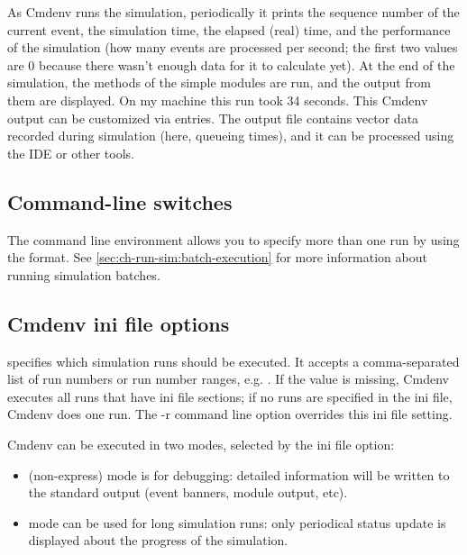 As Cmdenv runs the simulation, periodically it prints the sequence number
of the current event, the simulation time, the elapsed (real) time,
and the performance of the simulation (how many events are processed per
second; the first two values are 0 because there wasn't enough data
for it to calculate yet). At the end of the simulation, the 
methods of the simple modules are run, and the output from them are displayed.
On my machine this run took 34 seconds. This Cmdenv output can be
customized via  entries. The output file 
contains vector data recorded during simulation (here, queueing times),
and it can be processed using the IDE or other tools.

\subsection{Command-line switches}

The command line environment allows you to specify more than one run by
using the  format. See \ref{sec:ch-run-sim:batch-execution}
for more information about running simulation batches.

\subsection{Cmdenv ini file options}
\label{sec:ch-run-sim:cmdenv-section}

 specifies which simulation runs should be executed.
It accepts a comma-separated list of run numbers or run number ranges, e.g.
. If the value is missing, Cmdenv executes all runs that have
ini file sections; if no runs are specified in the ini file, Cmdenv does one run.
The -r command line option overrides this ini file setting.


Cmdenv can be executed in two modes, selected by the 
ini file option:

\begin{itemize}
    \item {} (non-express) mode is for debugging: detailed information
        will be written to the standard output (event banners, module output,
        etc).
    \item {} mode can be used for long simulation runs: only
        periodical status update is displayed about the progress of the
        simulation.
\end{itemize}

